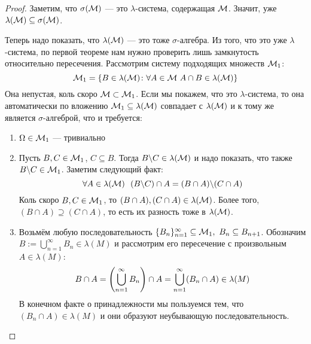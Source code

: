 \begin{proof}
	Заметим, что $\sigma(\mathcal{M})$ --- это $\lambda$-система, содержащая $\mathcal{M}$. Значит, уже $\lambda(\mathcal{M}) \subseteq \sigma(\mathcal{M})$.
	
	Теперь надо показать, что $\lambda(\mathcal{M})$ --- это тоже $\sigma$-алгебра. Из того, что это уже $\lambda$-система, по первой теореме нам нужно проверить лишь замкнутость относительно пересечения. Рассмотрим систему подходящих множеств $\mathcal{M}_1$:
	\[
		\mathcal{M}_1 = \{B \in \lambda(\mathcal{M}) \colon \forall A \in \mathcal{M}\ A \cap B \in \lambda(\mathcal{M})\}
	\]
	Она непустая, коль скоро $\mathcal{M} \subset \mathcal{M}_1$. Если мы покажем, что это $\lambda$-система, то она автоматически по вложению $\mathcal{M}_1 \subseteq \lambda(\mathcal{M})$ совпадает с $\lambda(\mathcal{M})$ и к тому же является $\sigma$-алгеброй, что и требуется:
	\begin{enumerate}
		\item $\Omega \in \mathcal{M}_1$ --- тривиально
		
		\item Пусть $B, C \in \mathcal{M}_1$, $C \subseteq B$. Тогда $B \backslash C \in \lambda(\mathcal{M})$ и надо показать, что также $B \backslash C \in \mathcal{M}_1$. Заметим следующий факт:
		\[
			\forall A \in \lambda(\mathcal{M})\ \ (B \backslash C) \cap A = (B \cap A) \backslash (C \cap A)
		\]
		Коль скоро $B, C \in \mathcal{M}_1$, то $(B \cap A), (C \cap A) \in \lambda(\mathcal{M})$. Более того, $(B \cap A) \supseteq (C \cap A)$, то есть их разность тоже в $\lambda(\mathcal{M})$.
		
		\item Возьмём любую последовательность $\{B_n\}_{n = 1}^\infty \subseteq \mathcal{M}_1,\ B_n \subseteq B_{n + 1}$. Обозначим $B := \bigcup_{n = 1}^\infty B_n \in \lambda(M)$ и рассмотрим его пересечение с произвольным $A \in \lambda(M)$:
		\[
			B \cap A = \left(\bigcup_{n = 1}^\infty B_n\right) \cap A = \bigcup_{n = 1}^\infty (B_n \cap A) \in \lambda(M)
		\]
		В конечном факте о принадлежности мы пользуемся тем, что $(B_n \cap A) \in \lambda(M)$ и они образуют неубывающую последовательность.
	\end{enumerate}
\end{proof}